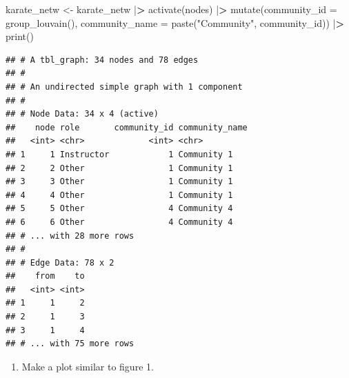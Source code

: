 \documentclass[
]{article}
\newenvironment{Shaded}{\begin{snugshade}}{\end{snugshade}}
\newcommand{\AttributeTok}[1]{\textcolor[rgb]{0.77,0.63,0.00}{#1}}
\newcommand{\ErrorTok}[1]{\textcolor[rgb]{0.64,0.00,0.00}{\textbf{#1}}}
\newcommand{\FunctionTok}[1]{\textcolor[rgb]{0.00,0.00,0.00}{#1}}
\newcommand{\NormalTok}[1]{#1}
\newcommand{\OtherTok}[1]{\textcolor[rgb]{0.56,0.35,0.01}{#1}}
\newcommand{\SpecialCharTok}[1]{\textcolor[rgb]{0.00,0.00,0.00}{#1}}
\newcommand{\StringTok}[1]{\textcolor[rgb]{0.31,0.60,0.02}{#1}}
\providecommand{\tightlist}{%
  \setlength{\itemsep}{0pt}\setlength{\parskip}{0pt}}
\begin{document}
\begin{Shaded}
\begin{Highlighting}[]
\NormalTok{karate\_netw }\OtherTok{\textless{}{-}} 
\NormalTok{  karate\_netw }\SpecialCharTok{|}\ErrorTok{\textgreater{}}
  \FunctionTok{activate}\NormalTok{(nodes) }\SpecialCharTok{|}\ErrorTok{\textgreater{}}
  \FunctionTok{mutate}\NormalTok{(}\AttributeTok{community\_id =} \FunctionTok{group\_louvain}\NormalTok{(),}
         \AttributeTok{community\_name =} \FunctionTok{paste}\NormalTok{(}\StringTok{"Community"}\NormalTok{, community\_id)) }\SpecialCharTok{|}\ErrorTok{\textgreater{}}
  \FunctionTok{print}\NormalTok{()}
\end{Highlighting}
\end{Shaded}

\begin{verbatim}
## # A tbl_graph: 34 nodes and 78 edges
## #
## # An undirected simple graph with 1 component
## #
## # Node Data: 34 x 4 (active)
##    node role       community_id community_name
##   <int> <chr>             <int> <chr>         
## 1     1 Instructor            1 Community 1   
## 2     2 Other                 1 Community 1   
## 3     3 Other                 1 Community 1   
## 4     4 Other                 1 Community 1   
## 5     5 Other                 4 Community 4   
## 6     6 Other                 4 Community 4   
## # ... with 28 more rows
## #
## # Edge Data: 78 x 2
##    from    to
##   <int> <int>
## 1     1     2
## 2     1     3
## 3     1     4
## # ... with 75 more rows
\end{verbatim}

\begin{enumerate}
\def\labelenumi{(\arabic{enumi})}
\setcounter{enumi}{10}
\tightlist
\item
  Make a plot similar to figure 1.
\end{enumerate}
\end{document}
